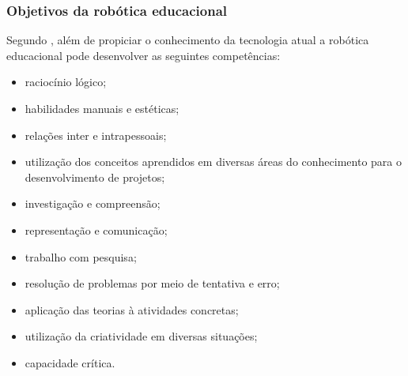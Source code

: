 \subsubsection{Objetivos da robótica educacional}
Segundo \cite{zilli2004robotica}, além de propiciar o conhecimento da tecnologia atual a robótica educacional pode desenvolver as seguintes competências:
\begin{itemize}
\item raciocínio lógico;
\item habilidades manuais e estéticas;
\item relações inter e intrapessoais;
\item utilização dos conceitos aprendidos em diversas áreas do conhecimento para o desenvolvimento de projetos;
\item investigação e compreensão;
\item representação e comunicação;
\item trabalho com pesquisa;
\item resolução de problemas por meio de tentativa e erro;
\item aplicação das teorias à atividades concretas;
\item utilização da criatividade em diversas situações;
\item capacidade crítica.
\end{itemize}

